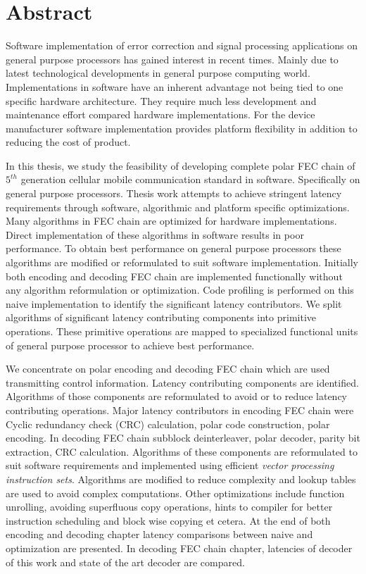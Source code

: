 \chapter*{Abstract}
Software implementation of error correction and signal processing applications on general purpose processors has gained interest in recent times. Mainly due to latest technological developments in general purpose computing world. Implementations in software have an inherent advantage not being tied to one specific hardware architecture. They require much less development and maintenance effort compared hardware implementations. For the device manufacturer software implementation provides platform flexibility in addition to reducing the cost of product. \newline

In this thesis, we study the feasibility of developing complete polar FEC chain of $5^{th}$ generation cellular mobile communication standard in software. Specifically on general purpose processors. Thesis work attempts to achieve stringent latency requirements through software, algorithmic and platform specific optimizations. Many algorithms in FEC chain are optimized for hardware implementations. Direct implementation of these algorithms in software results in poor performance. To obtain best performance on general purpose processors these algorithms are modified or reformulated to suit software implementation. Initially both encoding and decoding FEC chain are implemented functionally without any algorithm reformulation or optimization. Code profiling is performed on this naive implementation to identify the significant latency contributors. We split algorithms of significant latency contributing components into primitive operations. These primitive operations are mapped to specialized functional units of general purpose processor to achieve best performance. \newline

We concentrate on polar encoding and decoding FEC chain which are used transmitting control information. Latency contributing components are identified. Algorithms of those components are reformulated to avoid or to reduce latency contributing operations. Major latency contributors in encoding FEC chain were Cyclic redundancy check (CRC) calculation, polar code construction, polar encoding. In decoding FEC chain  subblock deinterleaver, polar decoder, parity bit extraction, CRC calculation. Algorithms of these components are reformulated to suit software requirements and implemented using efficient \emph{vector processing instruction sets}. Algorithms are modified to reduce complexity and lookup tables are used to avoid complex computations. Other optimizations include function unrolling, avoiding superfluous copy operations, hints to compiler for better instruction scheduling and block wise copying et cetera. At the end of both encoding and decoding chapter latency comparisons between naive and optimization are presented. In decoding FEC chain chapter, latencies of decoder of this work and state of the art decoder are compared.